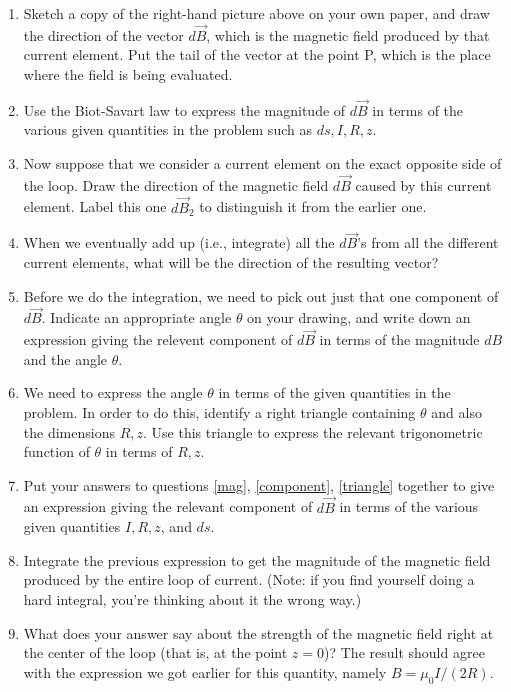 \documentclass{article}
\begin{document}
\begin{enumerate}
\item Sketch a copy of the right-hand picture above on your own paper, 
and draw the direction of the vector $d\vec{B}$,
which is the magnetic field produced by that current element.  Put the
tail of the vector at the point P, which is the place where the field
is being evaluated.  

\item \label{mag}
Use the Biot-Savart law to express the magnitude of $d\vec{B}$
in terms of the various given quantities in the problem such as $ds, I,
R,z$.

\item Now suppose that we consider a current element on the exact opposite
side of the loop.  Draw the direction of the magnetic field $d\vec{B}$
caused by this current element.  Label this one $d\vec{B}_2$ to distinguish
it from the earlier one.


\item When we eventually add up (i.e., integrate) all the $d\vec{B}$'s from
all the different current elements, what will be the direction of  
the resulting
vector?

\item \label{component}
Before we do the integration, we need to pick out just that
one component of $d\vec{B}$.  Indicate an appropriate angle $\theta$
on your drawing, and write down an expression giving the
relevent component of $d\vec{B}$ in terms of the magnitude
$dB$ and the angle $\theta$.

\item \label{triangle}
We need to express the angle $\theta$ in terms of the given
quantities in the problem.  In order to do this, identify a right
triangle containing $\theta$ and also the dimensions $R,z$.  Use this triangle
to express the relevant trigonometric function of $\theta$
in terms of $R,z$.  

\item Put your answers to questions \ref{mag}, \ref{component},
\ref{triangle} together
to give an expression giving the relevant component of $d\vec{B}$
in terms of the various given quantities $I,R,z$, and $ds$.

\item \label{answer1}
Integrate the previous expression to get the magnitude of the
magnetic field produced by the entire loop of current.  (Note: if you
find yourself doing a hard integral, you're thinking about it the wrong
way.)

\item What does your answer say about the strength of the magnetic
field right at the center of the loop (that is, at the point $z=0$)?
The result should agree with the expression we got earlier for 
this quantity, namely $B=\mu_0I/(2R)$.

\end{enumerate}
\end{document}
